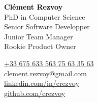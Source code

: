 \documentclass[a4paper]{article}
\newcommand\enfr[2]{\ifdefined\doen#1\else#2\fi\xspace}
\begin{document}
\color{DarkSlateGray}


\begin{minipage}[t]{0.63\textwidth}
  \Huge\textcolor{Black}{\textbf{Clément Rezvoy}}\normalsize\\

  PhD in Computer Science\\
  Senior Software Developper\\
  Junior Team Manager\\
  Rookie Product Owner\\
\end{minipage}
\hfill
\begin{minipage}[t]{0.27\textwidth}
  \href{tel:+33-675-633-563}{\enfr{+33 675 633 563}{06 75 63 35 63}} \\
  \href{mailto:clement.rezvoy@gmail.com}{clement.rezvoy@gmail.com} \\
  \href{https://linkedin.com/in/crezvoy}{linkedin.com/in/crezvoy} \\
  \href{https://github.com/crezvoy}{github.com/crezvoy}
\end{minipage}
\end{document}
